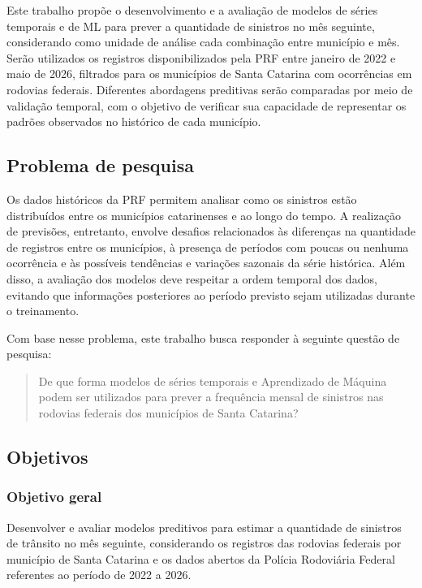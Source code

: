 \documentclass[12pt]{article}
\begin{document}
Este trabalho propõe o desenvolvimento e a avaliação de modelos de séries temporais e de ML para prever a quantidade de sinistros no mês seguinte, considerando como unidade de análise cada combinação entre município e mês. Serão utilizados os registros disponibilizados pela PRF entre janeiro de 2022 e maio de 2026, filtrados para os municípios de Santa Catarina com ocorrências em rodovias federais. Diferentes abordagens preditivas serão comparadas por meio de validação temporal, com o objetivo de verificar sua capacidade de representar os padrões observados no histórico de cada município.

\subsection{Problema de pesquisa}

Os dados históricos da PRF permitem analisar como os sinistros estão distribuídos entre os municípios catarinenses e ao longo do tempo. A realização de previsões, entretanto, envolve desafios relacionados às diferenças na quantidade de registros entre os municípios, à presença de períodos com poucas ou nenhuma ocorrência e às possíveis tendências e variações sazonais da série histórica. Além disso, a avaliação dos modelos deve respeitar a ordem temporal dos dados, evitando que informações posteriores ao período previsto sejam utilizadas durante o treinamento.

Com base nesse problema, este trabalho busca responder à seguinte questão de pesquisa:

\begin{quote}
De que forma modelos de séries temporais e Aprendizado de Máquina podem ser utilizados para prever a frequência mensal de sinistros nas rodovias federais dos municípios de Santa Catarina?
\end{quote}

\subsection{Objetivos}

\subsubsection{Objetivo geral}

Desenvolver e avaliar modelos preditivos para estimar a quantidade de sinistros de trânsito no mês seguinte, considerando os registros das rodovias federais por município de Santa Catarina e os dados abertos da Polícia Rodoviária Federal referentes ao período de 2022 a 2026.
\end{document}
